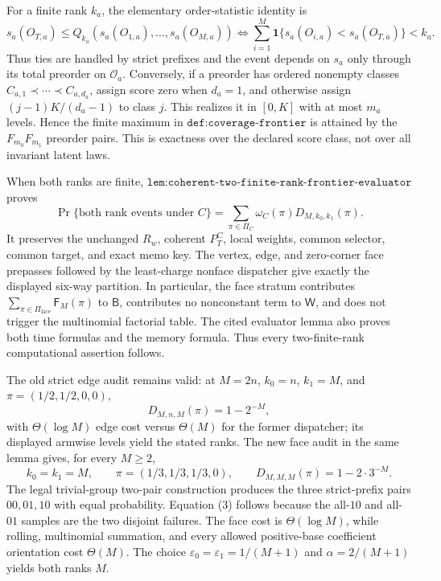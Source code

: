 For a finite rank \(k_a\), the elementary order-statistic identity is
\[
s_a(O_{T,a})\le Q_{k_a}(s_a(O_{1,a}),\ldots,s_a(O_{M,a}))
\iff
\sum_{i=1}^M\mathbf 1\{s_a(O_{i,a})<s_a(O_{T,a})\}<k_a.
\tag{1}
\]
Thus ties are handled by strict prefixes and the event depends on \(s_a\) only through its total preorder on \(\mathcal O_a\). Conversely, if a preorder has ordered nonempty classes
\(C_{a,1}\prec\cdots\prec C_{a,d_a}\), assign score zero when \(d_a=1\), and otherwise assign
\((j-1)K/(d_a-1)\) to class \(j\). This realizes it in \([0,K]\) with at most \(m_a\) levels. Hence the finite maximum in
\(\texttt{def:coverage-frontier}\) is attained by the
\(F_{m_0}F_{m_1}\) preorder pairs. This is exactness over the declared score class, not over all invariant latent laws.

When both ranks are finite,
\(\texttt{lem:coherent-two-finite-rank-frontier-evaluator}\) proves
\[
\Pr\{\text{both rank events under }C\}
=\sum_{\pi\in\Pi_C}\omega_C(\pi)D_{M,k_0,k_1}(\pi).
\tag{2}
\]
It preserves the unchanged \(R_w\), coherent \(P_T^C\), local weights, common selector, common target, and exact memo key. The vertex, edge, and zero-corner face prepasses followed by the least-charge nonface dispatcher give exactly the displayed six-way partition. In particular, the face stratum contributes
\(\sum_{\pi\in\Pi_{\mathrm{face}}}\mathsf F_M(\pi)\) to \(\mathsf B\), contributes no nonconstant term to \(\mathsf W\), and does not trigger the multinomial factorial table. The cited evaluator lemma also proves both time formulas and the memory formula. Thus every two-finite-rank computational assertion follows.

The old strict edge audit remains valid: at \(M=2n\), \(k_0=n\), \(k_1=M\), and \(\pi=(1/2,1/2,0,0)\),
\[
D_{M,n,M}(\pi)=1-2^{-M},
\]
with \(\Theta(\log M)\) edge cost versus \(\Theta(M)\) for the former dispatcher; its displayed armwise levels yield the stated ranks. The new face audit in the same lemma gives, for every \(M\ge2\),
\[
k_0=k_1=M,\qquad
\pi=(1/3,1/3,1/3,0),\qquad
D_{M,M,M}(\pi)=1-2\cdot3^{-M}.
\tag{3}
\]
The legal trivial-group two-pair construction produces the three strict-prefix pairs \(00,01,10\) with equal probability. Equation (3) follows because the all-\(10\) and all-\(01\) samples are the two disjoint failures. The face cost is \(\Theta(\log M)\), while rolling, multinomial summation, and every allowed positive-base coefficient orientation cost \(\Theta(M)\). The choice
\(\varepsilon_0=\varepsilon_1=1/(M+1)\) and
\(\alpha=2/(M+1)\) yields both ranks \(M\).


